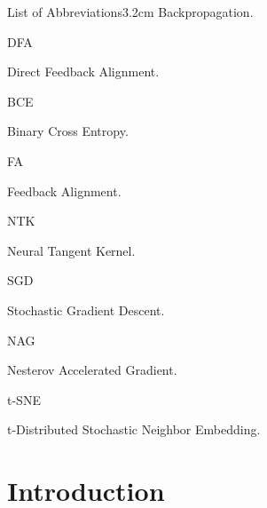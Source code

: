 \documentclass[a4paper, nobind]{templates/ociamthesis}
\begin{document}
\begin{romanpages}
\begin{mclistof}{List of Abbreviations}{3.2cm}
Backpropagation.

\item[DFA]

Direct Feedback Alignment.

\item[BCE]

Binary Cross Entropy.

\item[FA]

Feedback Alignment.

\item[NTK]

Neural Tangent Kernel.

\item[SGD]

Stochastic Gradient Descent.

\item[NAG]

Nesterov Accelerated Gradient.

\item[t-SNE]

t-Distributed Stochastic Neighbor Embedding.

\end{mclistof} 


\end{romanpages}

\flushbottom

\hypertarget{introduction}{%
\chapter*{Introduction}\label{introduction}}

\adjustmtc
{}
\end{document}
